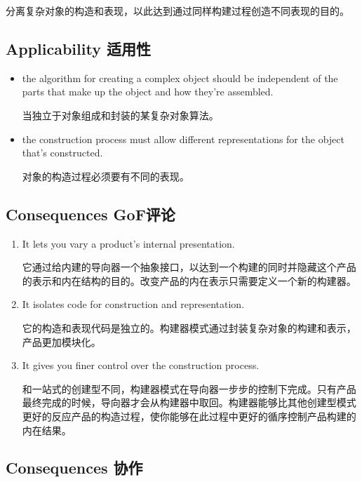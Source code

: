 分离复杂对象的构造和表现，以此达到通过同样构建过程创造不同表现的目的。

\subsection{Applicability 适用性}

\begin{itemize}
\item the algorithm for creating a complex object should be independent of the parts that make up the object and how they're assembled.

      当独立于对象组成和封装的某复杂对象算法。

\item the construction process must allow different representations for the object that's constructed.

      对象的构造过程必须要有不同的表现。
\end{itemize}

\subsection{Consequences GoF评论}

\begin{enumerate}

\item It lets you vary a product's internal presentation.

	  它通过给内建的导向器一个抽象接口，以达到一个构建的同时并隐藏这个产品的表示和内在结构的目的。改变产品的内在表示只需要定义一个新的构建器。

\item It isolates code for construction and representation. 

	 它的构造和表现代码是独立的。构建器模式通过封装复杂对象的构建和表示，产品更加模块化。

\item It gives you finer control over the construction process.

	  和一站式的创建型不同，构建器模式在导向器一步步的控制下完成。只有产品最终完成的时候，导向器才会从构建器中取回。构建器能够比其他创建型模式更好的反应产品的构造过程，使你能够在此过程中更好的循序控制产品构建的内在结果。

\end{enumerate}

\subsection{Consequences 协作}

